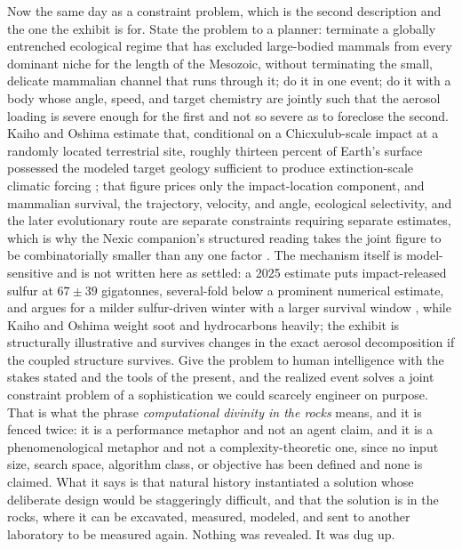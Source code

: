 Now the same day as a constraint problem, which is the second
description and the one the exhibit is for. State the problem to a
planner: terminate a globally entrenched ecological regime that has
excluded large-bodied mammals from every dominant niche for the length
of the Mesozoic, without terminating the small, delicate mammalian
channel that runs through it; do it in one event; do it with a body
whose angle, speed, and target chemistry are jointly such that the
aerosol loading is severe enough for the first and not so severe as to
foreclose the second. Kaiho and Oshima estimate that, conditional on a Chicxulub-scale impact
at a randomly located terrestrial site, roughly thirteen percent of
Earth's surface possessed the modeled target geology sufficient to
produce extinction-scale climatic forcing \cite{Kaiho2017}; that figure
prices only the impact-location component, and mammalian survival, the
trajectory, velocity, and angle, ecological selectivity, and the later
evolutionary route are separate constraints requiring separate
estimates, which is why the Nexic companion's structured reading takes
the joint figure to be combinatorially smaller than any one factor
\cite{Nexus}. The mechanism itself is model-sensitive and is not
written here as settled: a 2025 estimate puts impact-released sulfur at
$67\pm39$ gigatonnes, several-fold below a prominent numerical
estimate, and argues for a milder sulfur-driven winter with a larger
survival window \cite{Nature2025Sulfur}, while Kaiho and Oshima weight
soot and hydrocarbons heavily; the exhibit is structurally illustrative
and survives changes in the exact aerosol decomposition if the coupled
structure survives. Give the problem to human intelligence with the stakes
stated and the tools of the present, and the realized event solves a
joint constraint problem of a sophistication we could scarcely engineer
on purpose. That is what the phrase \emph{computational divinity in the
rocks} means, and it is fenced twice: it is a performance metaphor and
not an agent claim, and it is a phenomenological metaphor and not a
complexity-theoretic one, since no input size, search space, algorithm
class, or objective has been defined and none is claimed. What it says
is that natural history instantiated a solution whose deliberate design
would be staggeringly difficult, and that the solution is in the rocks,
where it can be excavated, measured, modeled, and sent to another
laboratory to be measured again. Nothing was revealed. It was dug up.

